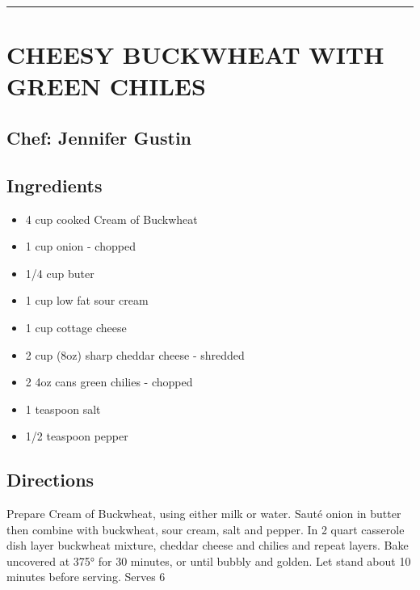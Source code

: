 \documentclass[
]{book}
\providecommand{\tightlist}{%
  \setlength{\itemsep}{0pt}\setlength{\parskip}{0pt}}
\begin{document}
\begin{center}\rule{0.5\linewidth}{0.5pt}\end{center}

\hypertarget{cheesy-buckwheat-with-green-chiles}{%
\section*{CHEESY BUCKWHEAT WITH GREEN CHILES}\label{cheesy-buckwheat-with-green-chiles}}


\hypertarget{chef-jennifer-gustin-7}{%
\subsection*{Chef: Jennifer Gustin}\label{chef-jennifer-gustin-7}}


\hypertarget{ingredients-47}{%
\subsection*{Ingredients}\label{ingredients-47}}


\begin{itemize}
\tightlist
\item
  4 cup cooked Cream of Buckwheat
\item
  1 cup onion - chopped
\item
  1/4 cup buter
\item
  1 cup low fat sour cream
\item
  1 cup cottage cheese
\item
  2 cup (8oz) sharp cheddar cheese - shredded
\item
  2 4oz cans green chilies - chopped
\item
  1 teaspoon salt
\item
  1/2 teaspoon pepper
\end{itemize}

\hypertarget{directions-47}{%
\subsection*{Directions}\label{directions-47}}


Prepare Cream of Buckwheat, using either milk or water. Sauté onion in butter then combine
with buckwheat, sour cream, salt and pepper. In 2 quart casserole dish layer buckwheat mixture,
cheddar cheese and chilies and repeat layers. Bake uncovered at 375° for 30 minutes,
or until bubbly and golden. Let stand about 10 minutes before serving. Serves 6
\end{document}
